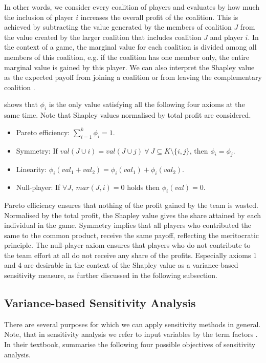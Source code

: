 In other words, we consider every coalition of players and evaluates by how much the inclusion of player $i$ increases the overall profit of the coalition. This is achieved by subtracting the value generated by the members of coalition $J$ from the value created by the larger coalition that includes coalition $J$ and player $i$. In the context of a game, the marginal value for each coalition is divided among all members of this coalition, e.g. if the coalition has one member only, the entire marginal value is gained by this player. We can also interpret the Shapley value as the expected payoff from joining a coalition or from leaving the complementary coalition \citep{PRB20}.

\citet{S53} shows that $\phi_i$ is the only value satisfying all the following four axioms at the same time. Note that Shapley values normalised by total profit are considered.

\begin{itemize}
    \item Pareto efficiency: $\sum_{i=1}^{k}\phi_i=1$.
	\item Symmetry: If $val(J \cup {i})=val(J \cup {j})\ \forall\ J \subseteq K \setminus{\{i, j\}}$, then $\phi_i = \phi_j$.
	\item Linearity: $\phi_i(val_1 + val_2)=\phi_i(val_1)+\phi_i(val_2)$.
	\item Null-player: If $\forall J,\ mar(J, i) = 0$ holds then $\phi_i(val) = 0$.
\end{itemize}

Pareto efficiency ensures that nothing of the profit gained by the team is wasted. Normalised by the total profit, the Shapley value gives the share attained by each individual in the game. Symmetry implies that all players who contributed the same to the common product, receive the same payoff, reflecting the meritocratic principle. The null-player axiom ensures that players who do not contribute to the team effort at all do not receive any share of the profits. Especially axioms 1 and 4 are desirable in the context of the Shapley value as a variance-based sensitivity measure, as further discussed in the following subsection.

\subsection{Variance-based Sensitivity Analysis} \label{var_based_sa}

There are several purposes for which we can apply sensitivity methods in general. Note, that in sensitivity analysis we refer to input variables by the term factors \citep{R21}. In their textbook, \citet{STC04} summarise the following four possible objectives of sensitivity analysis.

